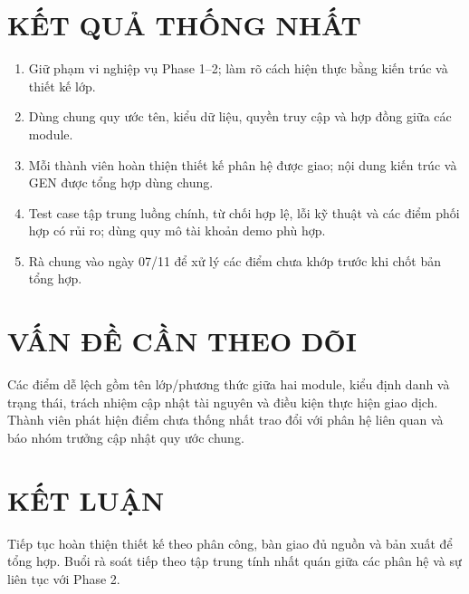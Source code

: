 \documentclass[10pt,a4paper]{article}
\begin{document}
\section{KẾT QUẢ THỐNG NHẤT}
\begin{enumerate}
\item Giữ phạm vi nghiệp vụ Phase 1--2; làm rõ cách hiện thực bằng kiến trúc và thiết kế lớp.
\item Dùng chung quy ước tên, kiểu dữ liệu, quyền truy cập và hợp đồng giữa các module.
\item Mỗi thành viên hoàn thiện thiết kế phân hệ được giao; nội dung kiến trúc và GEN được tổng hợp dùng chung.
\item Test case tập trung luồng chính, từ chối hợp lệ, lỗi kỹ thuật và các điểm phối hợp có rủi ro; dùng quy mô tài khoản demo phù hợp.
\item Rà chung vào ngày 07/11 để xử lý các điểm chưa khớp trước khi chốt bản tổng hợp.
\end{enumerate}

\section{VẤN ĐỀ CẦN THEO DÕI}
Các điểm dễ lệch gồm tên lớp/phương thức giữa hai module, kiểu định danh và trạng thái, trách nhiệm cập nhật tài nguyên và điều kiện thực hiện giao dịch. Thành viên phát hiện điểm chưa thống nhất trao đổi với phân hệ liên quan và báo nhóm trưởng cập nhật quy ước chung.

\section{KẾT LUẬN}
Tiếp tục hoàn thiện thiết kế theo phân công, bàn giao đủ nguồn và bản xuất để tổng hợp. Buổi rà soát tiếp theo tập trung tính nhất quán giữa các phân hệ và sự liên tục với Phase 2.
\end{document}
